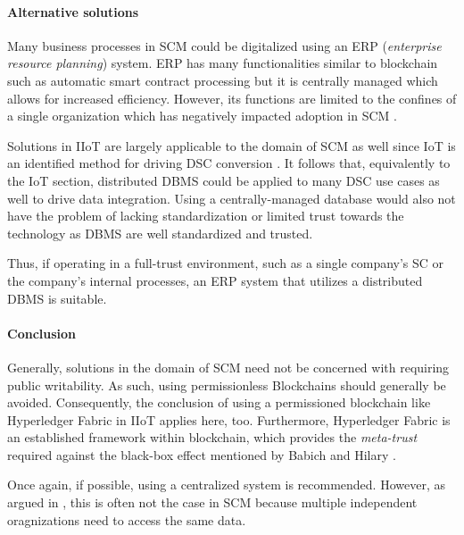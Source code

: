 \paragraph{Alternative solutions}

Many business processes in SCM could be digitalized using an ERP
(\textit{enterprise resource planning}) system. ERP has many
functionalities similar to blockchain such as automatic smart contract
processing but it is centrally managed which allows for increased
efficiency. However, its functions are limited to the confines of a
single organization which has negatively impacted adoption in SCM
\cite{coleBlockchain}.

Solutions in IIoT are largely applicable to the domain of SCM as well
since IoT is an identified method for driving DSC conversion
\cite{buyukozkanDigital}. It follows that, equivalently to the IoT
section, distributed DBMS could be applied to many DSC use cases as
well to drive data integration. Using a centrally-managed database
would also not have the problem of lacking standardization or limited
trust towards the technology as DBMS are well standardized and
trusted.

Thus, if operating in a full-trust environment, such as a single
company's SC or the company's internal processes, an ERP system that
utilizes a distributed DBMS is suitable.


\paragraph{Conclusion}

Generally, solutions in the domain of SCM need not be concerned with
requiring public writability. As such, using permissionless
Blockchains should generally be avoided. Consequently, the conclusion
of using a permissioned blockchain like Hyperledger Fabric in IIoT
applies here, too. Furthermore, Hyperledger Fabric is an established
framework within blockchain, which provides the \textit{meta-trust}
required against the black-box effect mentioned by Babich and Hilary
\cite{babichDistributed}.

Once again, if possible, using a centralized system is recommended.
However, as argued in \cite{coleBlockchain}, this is often not the
case in SCM because multiple independent oragnizations need to access the
same data.


